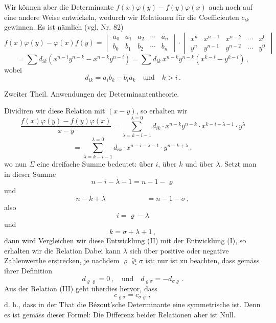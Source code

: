 Wir k\"onnen aber die Determinante $f(x)\varphi(y) - f(y)\varphi(x)$ auch noch
auf eine andere Weise entwickeln, wodurch wir Relationen f\"ur die
Coefficienten $c_{ik}$ gewinnen. Es ist n\"amlich (vgl. Nr. 82)
\[
f(x)\varphi(y) - \varphi(x)f(y) =
\begin{vmatrix} a_0 & a_1 & a_2 & \cdots & a_n \\ b_0 & b_1 & b_2 & \cdots & b_n \end{vmatrix}
\cdot
\begin{vmatrix} x^n & x^{n-1} & x^{n-2} & \cdots & x^0 \\ y^n & y^{n-1} & y^{n-2} & \cdots & y^0 \end{vmatrix}
\]
\[
= \sum d_{ik}(x^{n-i}y^{n-k} - x^{n-k}y^{n-i}) = \sum d_{ik}\, x^{n-k}y^{n-k}(x^{k-i}-y^{k-i})\,,
\]
wobei
\[
d_{ik} = a_i b_k - b_i a_k \quad \text{und} \quad k > i\,.
\]


Zweiter Theil. Anwendungen der Determinantentheorie.

Dividiren wir diese Relation mit $(x-y)$, so erhalten wir
\[
\frac{f(x)\varphi(y)-f(y)\varphi(x)}{x-y} = \sum_{\lambda=k-i-1}^{\lambda=0} d_{ik} \cdot x^{n-k}y^{n-k} \cdot x^{k-i-\lambda-1} \cdot y^{\lambda}
\]
\[
= \sum_{\lambda=k-i-1}^{\lambda=0} d_{ik} \cdot x^{n-i-\lambda-1} \cdot y^{n-k+\lambda}\,,
\]
wo nun $\Sigma$ eine dreifache Summe bedeutet: \"uber $i$, \"uber $k$ und \"uber
$\lambda$. Setzt man in dieser Summe
\[
n-i-\lambda-1 = n-1-\varrho
\]
und
\[
n-k+\lambda \phantom{n-i-\lambda-1} = n-1-\sigma\,,
\]
also
\[
i = \varrho - \lambda
\]
und
\[
k = \sigma+\lambda+1\,,
\]
dann wird
Vergleichen wir diese Entwicklung (II) mit der Entwicklung (I), so
erhalten wir die Relation
Dabei kann $\lambda$ sich \"uber positive oder negative Zahlenwerthe
erstrecken, je nachdem $\varrho \gtrless \sigma$ ist; nur ist zu beachten, dass
gem\"ass ihrer Definition
\[
d_{\varrho\varrho} = 0\,, \quad \text{und} \quad d_{\varrho\sigma} = -d_{\sigma\varrho}\,.
\]
Aus der Relation (III) geht \"uberdies hervor, dass
\[
c_{\varrho\sigma} = c_{\sigma\varrho}\,,
\]
d. h., dass in der That die B\'ezout'sche Determinante eine symmetrische
ist. Denn es ist gem\"ass dieser Formel:
Die Differenz beider Relationen aber ist Null.

